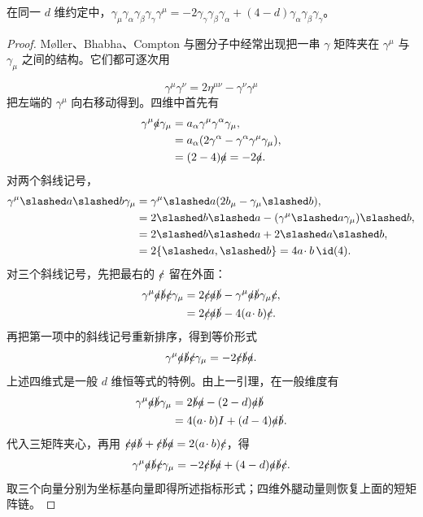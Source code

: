 \begin{lemma}
在同一 $d$ 维约定中，$\gamma_\mu\gamma_\alpha\gamma_\beta\gamma_\gamma\gamma^\mu=-2\gamma_\gamma\gamma_\beta\gamma_\alpha+(4-d)\gamma_\alpha\gamma_\beta\gamma_\gamma$。
\end{lemma}
\begin{proof}
M\o ller、Bhabha、Compton 与圈分子中经常出现把一串 $\gamma$ 矩阵夹在 $\gamma^\mu$ 与 $\gamma_\mu$ 之间的结构。它们都可逐次用

\begin{equation*}
 \gamma^\mu\gamma^\nu=2\eta^{\mu\nu}-\gamma^\nu\gamma^\mu
 \end{equation*}
把左端的 $\gamma^\mu$ 向右移动得到。四维中首先有
\begin{align*}
 \gamma^\mu\slashed a\gamma_\mu
 &=a_\alpha\gamma^\mu\gamma^\alpha\gamma_\mu,\\
 &=a_\alpha(2\gamma^\alpha-\gamma^\alpha\gamma^\mu\gamma_\mu),\\
 &=(2-4)\slashed a=-2\slashed a.
 \end{align*}
对两个斜线记号，
\begin{align*}
 \gamma^\mu\slashed a\slashed b\gamma_\mu
 &=\gamma^\mu\slashed a(2b_\mu-\gamma_\mu\slashed b),\\
 &=2\slashed b\slashed a-
 (\gamma^\mu\slashed a\gamma_\mu)\slashed b,\\
 &=2\slashed b\slashed a+2\slashed a\slashed b,\\
 &=2\{\slashed a,\slashed b\}=4a\!\cdot b\,\id(4).
 \end{align*}
对三个斜线记号，先把最右的 $\slashed c$ 留在外面：
\begin{align*}
 \gamma^\mu\slashed a\slashed b\slashed c\gamma_\mu
 &=2\slashed c\slashed a\slashed b
 -\gamma^\mu\slashed a\slashed b\gamma_\mu\slashed c,\\
 &=2\slashed c\slashed a\slashed b-4(a\!\cdot b)\slashed c.
\end{align*}
再把第一项中的斜线记号重新排序，得到等价形式
\begin{equation*}
 {
 \gamma^\mu\slashed a\slashed b\slashed c\gamma_\mu
 =-2\slashed c\slashed b\slashed a.}
 \end{equation*}
上述四维式是一般 $d$ 维恒等式的特例。由上一引理，在一般维度有
\begin{align*}
\gamma^\mu\slashed a\slashed b\gamma_\mu
&=2\slashed b\slashed a-(2-d)\slashed a\slashed b\\
&=4(a\!\cdot b)I+(d-4)\slashed a\slashed b.
\end{align*}
代入三矩阵夹心，再用
$\slashed c\slashed a\slashed b+\slashed c\slashed b\slashed a=2(a\!\cdot b)\slashed c$，得
\[
\gamma^\mu\slashed a\slashed b\slashed c\gamma_\mu
=-2\slashed c\slashed b\slashed a+(4-d)\slashed a\slashed b\slashed c.
\]
取三个向量分别为坐标基向量即得所述指标形式；四维外腿动量则恢复上面的短矩阵链。
\end{proof}

